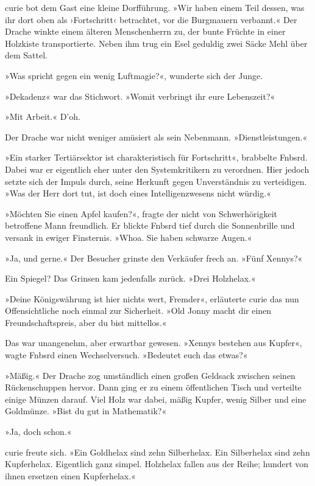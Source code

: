 curie bot dem Gast eine kleine Dorfführung. »Wir haben einem Teil dessen, was ihr dort oben als ›Fortschritt‹ betrachtet, vor die Burgmauern verbannt.« Der Drache winkte einem älteren Menschenherrn zu, der bunte Früchte in einer Holzkiste transportierte. Neben ihm trug ein Esel geduldig zwei Säcke Mehl über dem Sattel.

»Was spricht gegen ein wenig Luftmagie?«, wunderte sich der Junge.

»Dekadenz« war das Stichwort. »Womit verbringt ihr eure Lebenszeit?«

»Mit Arbeit.« D'oh.

Der Drache war nicht weniger amüsiert als sein Nebenmann. »Dienstleistungen.«

»Ein starker Tertiärsektor ist charakteristisch für Fortschritt«, brabbelte Fnbsrd. Dabei war er eigentlich eher unter den Systemkritikern zu verordnen. Hier jedoch setzte sich der Impuls durch, seine Herkunft gegen Unverständnis zu verteidigen. »Was der Herr dort tut, ist doch eines Intelligenzwesens nicht würdig.«

»Möchten Sie einen Apfel kaufen?«, fragte der nicht von Schwerhörigkeit betroffene Mann freundlich. Er blickte Fnbsrd tief durch die Sonnenbrille und versank in ewiger Finsternis. »Whoa. Sie haben schwarze Augen.«

»Ja, und gerne.« Der Besucher grinste den Verkäufer frech an. »Fünf Xennys?«

Ein Spiegel? Das Grinsen kam jedenfalls zurück. »Drei Holzhelax.«

»Deine Königswährung ist hier nichts wert, Fremder«, erläuterte curie das nun Offensichtliche noch einmal zur Sicherheit. »Old Jonny macht dir einen Freundschaftspreis, aber du bist mittellos.«

Das war unangenehm, aber erwartbar gewesen. »Xennys bestehen aus Kupfer«, wagte Fnbsrd einen Wechselversuch. »Bedeutet euch das etwas?«

»Mäßig.« Der Drache zog umständlich einen großen Geldsack zwischen seinen Rückenschuppen hervor. Dann ging er zu einem öffentlichen Tisch und verteilte einige Münzen darauf. Viel Holz war dabei, mäßig Kupfer, wenig Silber und eine Goldmünze. »Bist du gut in Mathematik?«

 »Ja, doch schon.« 

curie freute sich. »Ein Goldhelax sind zehn Silberhelax. Ein Silberhelax sind zehn Kupferhelax. Eigentlich ganz simpel. Holzhelax fallen aus der Reihe; hundert von ihnen ersetzen einen Kupferhelax.«

